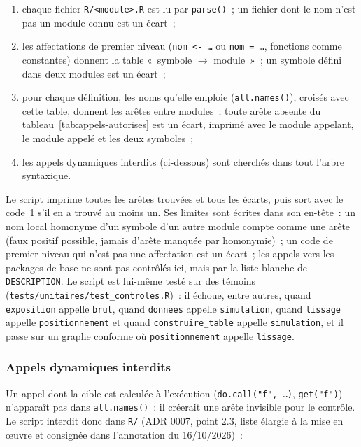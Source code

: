 \documentclass[a4paper,11pt]{article}
\newcommand{\code}[1]{\texttt{\small #1}}
\begin{document}
\begin{enumerate}[leftmargin=*, itemsep=2pt]
  \item chaque fichier \code{R/<module>.R} est lu par \code{parse()}~; un fichier
    dont le nom n'est pas un module connu est un écart~;
  \item les affectations de premier niveau (\code{nom <- \ldots} ou
    \code{nom = \ldots}, fonctions comme constantes) donnent la table
    «~symbole $\to$ module~»~; un symbole défini dans deux modules est un
    écart~;
  \item pour chaque définition, les noms qu'elle emploie (\code{all.names()}),
    croisés avec cette table, donnent les arêtes entre modules~; toute arête
    absente du tableau~\ref{tab:appels-autorises} est un écart, imprimé avec le
    module appelant, le module appelé et les deux symboles~;
  \item les appels dynamiques interdits (ci-dessous) sont cherchés dans tout
    l'arbre syntaxique.
\end{enumerate}

\noindent
Le script imprime toutes les arêtes trouvées et tous les écarts, puis sort
avec le code~1 s'il en a trouvé au moins un. Ses limites sont écrites dans son en-tête~: un nom local homonyme d'un
symbole d'un autre module compte comme une arête (faux positif possible,
jamais d'arête manquée par homonymie)~; un code de premier niveau qui n'est
pas une affectation est un écart~; les appels vers les packages de base ne
sont pas contrôlés ici, mais par la liste blanche de \code{DESCRIPTION}. Le
script est lui-même testé sur des témoins (\code{tests/unitaires/test\_controles.R})~:
il échoue, entre autres, quand \code{exposition} appelle \code{brut}, quand
\code{donnees} appelle \code{simulation}, quand \code{lissage} appelle
\code{positionnement} et quand \code{construire\_table} appelle
\code{simulation}, et il passe sur un graphe conforme où \code{positionnement}
appelle \code{lissage}.

\subsubsection*{Appels dynamiques interdits}

Un appel dont la cible est calculée à l'exécution (\code{do.call("f", \ldots)},
\code{get("f")}) n'apparaît pas dans \code{all.names()}~: il créerait une
arête invisible pour le contrôle. Le script interdit donc dans \code{R/}
(ADR 0007, point 2.3, liste élargie à la mise en œuvre et consignée dans
l'annotation du 16/10/2026)~:
\end{document}
